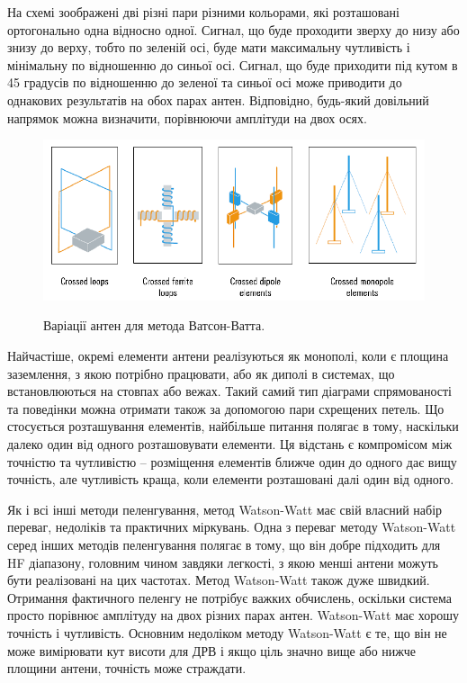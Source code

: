 \documentclass{article}
\begin{document}
На схемі зоображені дві різні пари різними кольорами, які розташовані ортогонально одна відносно одної. Сигнал, що буде проходити зверху до низу або знизу до верху, тобто по зеленій осі, буде мати максимальну чутливість і мінімальну по відношенню до синьої осі. Сигнал, що буде приходити під кутом в 45 градусів по відношенню до зеленої та синьої осі може приводити до однакових результатів на обох парах антен. Відповідно, будь-який довільний напрямок можна визначити, порівнюючи амплітуди на двох осях.

\begin{figure}[H]
	\centering
	{\includegraphics[width=0.7
		\linewidth]{images/adkock_antennas.png}}
	\caption{\label{fig:rdf:dopler} Варіації антен для метода Ватсон-Ватта.}
\end{figure}

Найчастіше, окремі елементи антени реалізуються як монополі, коли є площина заземлення, з якою потрібно працювати, або як диполі в системах, що встановлюються на стовпах або вежах. Такий самий тип діаграми спрямованості та поведінки можна отримати також за допомогою пари схрещених петель. Що стосується розташування елементів, найбільше питання полягає в тому, наскільки далеко один від одного розташовувати елементи. Ця відстань є компромісом між точністю та чутливістю – розміщення елементів ближче один до одного дає вищу точність, але чутливість краща, коли елементи розташовані далі один від одного.

Як і всі інші методи пеленгування, метод Watson-Watt має свій власний набір переваг, недоліків та практичних міркувань. Одна з переваг методу Watson-Watt серед інших методів пеленгування полягає в тому, що він добре підходить для HF діапазону, головним чином завдяки легкості, з якою менші антени можуть бути реалізовані на цих частотах. Метод Watson-Watt також дуже швидкий. Отримання фактичного пеленгу не потрібує важких обчислень, оскільки система просто порівнює амплітуду на двох різних парах антен. Watson-Watt має хорошу точність і чутливість. Основним недоліком методу Watson-Watt є те, що він не може вимірювати кут висоти для ДРВ і якщо ціль значно вище або нижче площини антени, точність може страждати.
\end{document}
